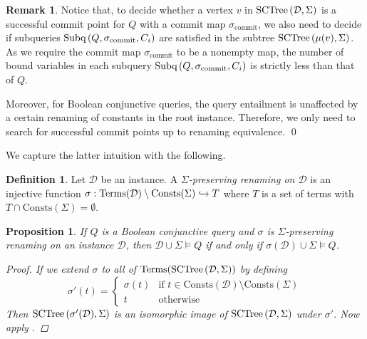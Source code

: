 \documentclass[12pt]{report}
\theoremstyle{plain}
\newtheorem{proposition}[theorem]{Proposition}
\theoremstyle{definition}
\newtheorem{definition}[theorem]{Definition}
\newtheorem{remark}[theorem]{Remark}
\def\Consts{{\mathrm{Consts}}}
\def\Terms{{\mathrm{Terms}}}
\newcommand{\SCTree}[2]{\ensuremath{\normalfont{\textrm{SCTree}} \left( #1, #2 \right)}}
\newcommand{\Subq}[3]{\ensuremath{\normalfont{\textrm{Subq}} \left( #1, #2, #3 \right)}}
\begin{document}
\begin{remark}
\label{remark-towards-query-answering-procedure}
  Notice that, to decide whether a vertex $v$ in $\SCTree{\mathcal{D}}{\Sigma}$ is a successful commit point for $Q$ with a commit map $\sigma_{\mathrm{commit}}$, we also need to decide if subqueries $\Subq{Q}{\sigma_{\mathrm{commit}}}{C_i}$ are satisfied in the subtree $\SCTree{\mu(v)}{\Sigma}$. As we require the commit map $\sigma_{\mathrm{commit}}$ to be a nonempty map, the number of bound variables in each subquery $\Subq{Q}{\sigma_{\mathrm{commit}}}{C_i}$ is strictly less than that of $Q$.

  Moreover, for Boolean conjunctive queries, the query entailment is unaffected by a certain renaming of constants in the root instance. Therefore, we only need to search for successful commit points up to renaming equivalence.
  \qed
\end{remark}

We capture the latter intuition with the following.

\begin{definition}
  Let $\mathcal{D}$ be an instance. A \emph{$\Sigma$-preserving renaming on $\mathcal{D}$} is an injective function $\sigma: \Terms(\mathcal{D}) \setminus \Consts(\Sigma) \xhookrightarrow{} T$ where $T$ is a set of terms with $T \cap \Consts(\Sigma) = \emptyset$.
\end{definition}

\begin{proposition}
\label{bcq-invariant-under-sigma-preserving-renaming}
  If $Q$ is a Boolean conjunctive query and $\sigma$ is $\Sigma$-preserving renaming on an instance $\mathcal{D}$, then $\mathcal{D} \cup \Sigma \models Q$ if and only if $\sigma(\mathcal{D}) \cup \Sigma \models Q$.
  \begin{proof}
    If we extend $\sigma$ to all of $\Terms(\SCTree{\mathcal{D}}{\Sigma})$ by defining $$\sigma'(t) =
    \begin{cases}
      \sigma(t) & \text{if } t \in \Consts(\mathcal{D}) \setminus \Consts(\Sigma) \\
      t & \text{otherwise}
    \end{cases}$$
    Then $\SCTree{\sigma'(\mathcal{D})}{\Sigma}$ is an isomorphic image of $\SCTree{\mathcal{D}}{\Sigma}$ under $\sigma'$. Now apply .
  \end{proof}
\end{proposition}
\end{document}
